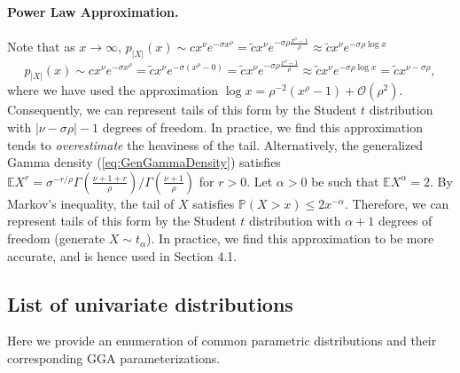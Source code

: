 \documentclass[../thesis.tex]{subfiles}
\begin{document}
\paragraph{Power Law Approximation.} Note that as $x \to \infty$, $p_{|X|}(x) \sim c x^\nu e^{-\sigma x^\rho} = \tilde{c}x^\nu e^{-\sigma\rho\frac{x^\rho - 1}{\rho}} \approx \tilde{c} x^\nu e^{-\sigma\rho \log x}$
\[
  p_{|X|}(x) \sim c x^\nu e^{-\sigma x^\rho} = \tilde{c} x^\nu e^{-\sigma(x^\rho - 0)} = \tilde{c} x^\nu e^{-\sigma\rho\frac{x^\rho - 1}{\rho}} \approx \tilde{c} x^\nu e^{-\sigma\rho \log x} = \tilde{c} x^{\nu-\sigma \rho},
\]
where we have used the approximation $\log x = \rho^{-2}(x^\rho - 1) + \mathcal{O}(\rho^2)$. Consequently, we can represent tails of this form by the Student $t$ distribution with $|\nu-\sigma\rho|-1$ degrees of freedom. In practice, we find this approximation tends to \emph{overestimate} the heaviness of the tail. Alternatively, the generalized Gamma density (\ref{eq:GenGammaDensity}) satisfies $\mathbb{E}X^r = \sigma^{-r/\rho} \Gamma(\frac{\nu+1+r}{\rho})/\Gamma(\frac{\nu+1}{\rho})$ for $r > 0$. Let $\alpha > 0$ be such that $\mathbb{E}X^\alpha = 2$. By Markov's inequality, the tail of $X$ satisfies $\mathbb{P}(X>x)\leq 2 x^{-\alpha}$. Therefore, we can represent tails of this form by the Student $t$ distribution with $\alpha+1$ degrees of freedom (generate $X \sim t_{\alpha}$). In practice, we find this approximation to be more accurate, and is hence used in Section 4.1.

\subsection{List of univariate distributions}

Here we provide an enumeration of common parametric distributions and their
corresponding GGA parameterizations.
\end{document}
